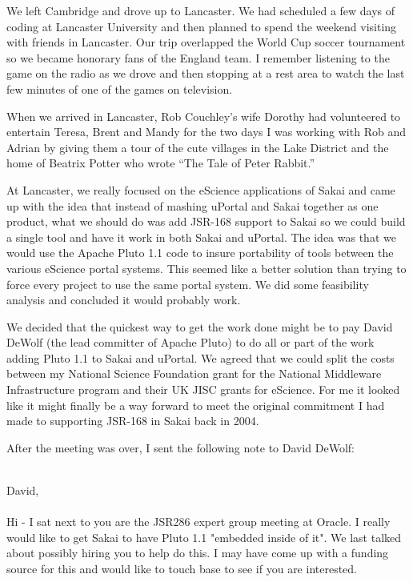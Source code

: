 \documentclass[12pt]{book}
\begin{document}
We left Cambridge and drove up to Lancaster.   We had scheduled a few days
of coding at Lancaster University and then planned to spend the weekend
visiting with friends in Lancaster.  Our trip overlapped the World
Cup soccer tournament so we became honorary fans of the England team.
I remember listening to the game on the radio as we drove and then
stopping at a rest area to watch the last few minutes of one of the games
on television.

When we arrived in Lancaster, Rob Couchley's wife Dorothy had volunteered
to entertain Teresa, Brent and Mandy for the two days I was working with Rob
and Adrian by giving them a tour of the cute villages in the Lake District
and the home of Beatrix Potter who wrote ``The Tale of Peter Rabbit.''

At Lancaster, we really focused on the eScience applications of Sakai and
came up with the idea that instead of mashing uPortal and Sakai
together as one product, what we should do was add JSR-168 support to
Sakai so we could build a single tool and have it work in both Sakai and
uPortal.  The idea was that we would use the Apache Pluto 1.1 code
to insure portability of tools between the various eScience portal systems.
This seemed like a better solution than trying to force every project
to use the same portal system.  We did some feasibility analysis and
concluded it would probably work.

We decided that the quickest way to get the work done might be to pay
David DeWolf (the lead committer of Apache Pluto) to do all or part
of the work adding Pluto 1.1 to Sakai and uPortal.  We agreed that we could split
the costs between my National Science Foundation grant for
the National Middleware Infrastructure program and their UK JISC grants
for eScience.  For me it looked like it might finally be a way forward
to meet the original commitment I had made to supporting JSR-168
in Sakai back in 2004.

After the meeting was over, I sent the following note to David DeWolf:\\
\\
\begin{sf}
David,\\
\\
Hi - I sat next to you are the JSR286 expert group meeting
at Oracle.  I really would like to get Sakai to have Pluto 1.1
"embedded inside of it".  We last talked about possibly hiring
you to help do this.  I may have come up with a funding source
for this and would like to touch base to see if you are interested.\\
\end{sf}
\end{document}
